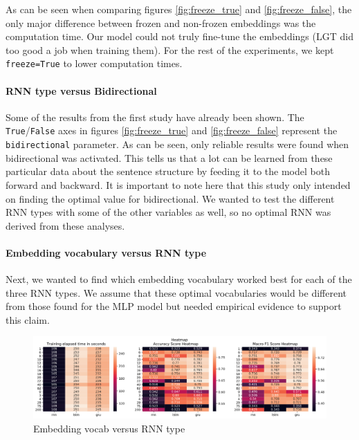As can be seen when comparing figures \ref{fig:freeze_true} and \ref{fig:freeze_false}, the only major difference between frozen and non-frozen embeddings was the computation time. Our model could not truly fine-tune the embeddings (LGT did too good a job when training them). For the rest of the experiments, we kept \texttt{freeze=True} to lower computation times. 

\paragraph{RNN type versus Bidirectional}
Some of the results from the first study have already been shown. The \texttt{True}/\texttt{False} axes in figures \ref{fig:freeze_true} and \ref{fig:freeze_false} represent the \texttt{bidirectional} parameter. As can be seen, only reliable results were found when bidirectional was activated. This tells us that a lot can be learned from these particular data about the sentence structure by feeding it to the model both forward and backward. It is important to note here that this study only intended on finding the optimal value for bidirectional. We wanted to test the different RNN types with some of the other variables as well, so no optimal RNN was derived from these analyses. 

\paragraph{Embedding vocabulary versus RNN type}
Next, we wanted to find which embedding vocabulary worked best for each of the three RNN types. We assume that these optimal vocabularies would be different from those found for the MLP model but needed empirical evidence to support this claim.

\begin{figure}[H]
    \centering
    \includegraphics[width=1\linewidth]{pictures/VocabRnnType_heatmap.png}
    \caption{Embedding vocab versus RNN type}
    \label{fig:vocab_rnn}
\end{figure}

